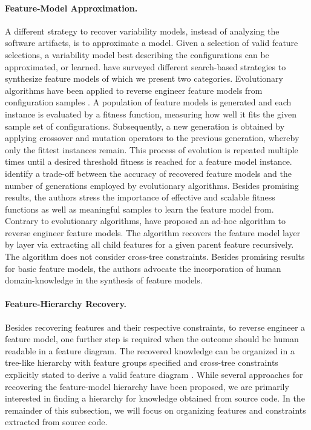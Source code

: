 \paragraph{Feature-Model Approximation.}
A different strategy to recover variability models, instead of analyzing the
software artifacts, is to approximate a model. Given a selection of valid
feature selections, a variability model best describing the configurations can
be approximated, or learned. \cite{lopez-herrejon_assessment_2015} have surveyed
different search-based strategies to synthesize feature models of which we
present two categories. Evolutionary algorithms have been applied to reverse
engineer feature models from configuration samples
\citep{lopez-herrejon_reverse_2012,linsbauer_feature_2014}. A population of
feature models is generated and each instance is evaluated by a fitness
function, measuring how well it fits the given sample set of configurations.
Subsequently, a new generation is obtained by applying crossover and mutation
operators to the previous generation, whereby only the fittest instances remain.
This process of evolution is repeated multiple times until a desired threshold fitness is reached for a feature model instance.
\cite{lopez-herrejon_reverse_2012} identify a trade-off between the accuracy of
recovered feature models and the number of generations employed by evolutionary
algorithms. Besides promising results, the authors stress the importance of
effective and scalable fitness functions as well as meaningful samples to learn
the feature model from.
Contrary to evolutionary algorithms,
\cite{haslinger_reverse_2011,haslinger_extracting_2013} have proposed an ad-hoc
algorithm to reverse engineer feature models. The algorithm recovers
the feature model layer by layer via extracting all child
features for a given parent feature recursively. The algorithm does not consider
cross-tree constraints.
Besides promising results for basic feature models, the authors advocate the
incorporation of human domain-knowledge in the synthesis of feature models.
 
\paragraph{Feature-Hierarchy Recovery.} \label{sec:feature_hierarchy}
Besides recovering features and their respective constraints, to reverse
engineer a feature model, one further step is required when the outcome should
be human readable in a feature diagram. The recovered knowledge can be
organized in a tree-like hierarchy with feature groups specified and cross-tree
constraints explicitly stated to derive a valid feature diagram
\citep{kang_feature-oriented_1990}.
While several approaches for recovering the feature-model hierarchy have been
proposed, we are primarily interested in finding a hierarchy for knowledge
obtained from source code. In the remainder of this
subsection, we will focus on organizing features and constraints extracted from
source code.

